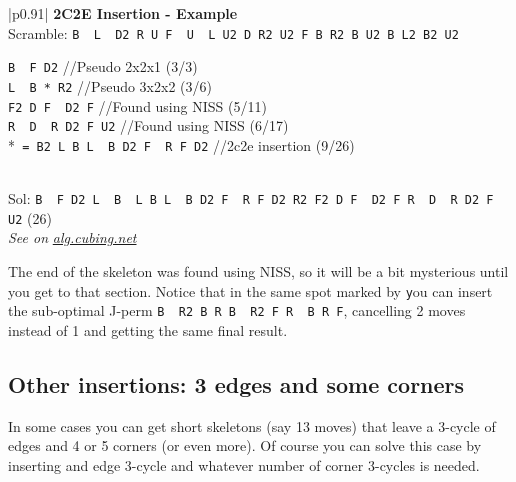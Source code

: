 \documentclass[11pt,a4paper]{book}
\newcommand{\p}{\textquotesingle}
\newcommand{\m}{\texttt}
\newcommand{\ps}{\p\,\,}
\newcommand{\comment}[1]{{\color{gray}\quad//#1}}
\begin{document}
\bigskip
\begin{tabular}{|p{}|}
\hline
\textbf{2C2E Insertion - Example}\\
\hline
Scramble: \m{B\ps L\ps D2 R U F\ps U\ps L U2 D R2 U2 F B R2 B U2 B L2 B2 U2}\\
\hline
\begin{minipage}[l]{0.650\textwidth}
\m{B\ps F D2} \comment{Pseudo 2x2x1 (3/3)}\\
\m{L\ps B * R2} \comment{Pseudo 3x2x2 (3/6)}\\
\m{F2 D F\ps D2 F} \comment{Found using NISS (5/11)}\\
\m{R\ps D\ps R D2 F U2} \comment{Found using NISS (6/17)}\\
*\m{ = B2 L B L\ps B D2 F\ps R F D2} \comment{2c2e insertion (9/26)}
\end{minipage}
\begin{minipage}[c]{0.25\textwidth}

\end{minipage}\\
\hline
Sol: \m{B\ps F D2 L\ps B\ps L B L\ps B D2 F\ps R F D2 R2 F2 D F\ps D2 F R\ps D\ps R D2 F U2} (26)\\
\hline
\emph{See on }\href{https://alg.cubing.net/?setup=B-_L-_D2_R_U_F-_U-_L_U2_D_R2_U2_F_B_R2_B_U2_B_L2_B2_U2&alg=B-_F_D2_\%2F\%2FPseudo_2x2x1_(3\%2F3)\%0AL-_B_(B2_L_B_L-_B_D2_F-_R_F_D2)_R2_\%2F\%2FPseudo_3x2x2_(3\%2F6)\%0AF2_D_F-_D2_F_\%2F\%2FFound_using_NISS_(5\%2F11)\%0AR-_D-_R_D2_F_U2_\%2F\%2FFound_using_NISS_(6\%2F17)}{\emph{alg.cubing.net}}\\
\hline
\end{tabular}
\bigskip

The end of the skeleton was found using NISS, so it will be a bit mysterious until you get to that section. Notice that in the same spot marked by \m * you can insert the sub-optimal J-perm \m{B\ps R2 B R B\ps R2 F R\ps B R F\p}, cancelling 2 moves instead of 1 and getting the same final result.

\subsection{Other insertions: 3 edges and some corners}
\label{3enc}

In some cases you can get short skeletons (say 13 moves) that leave a 3-cycle of edges and 4 or 5 corners (or even more). Of course you can solve this case by inserting and edge 3-cycle and whatever number of corner 3-cycles is needed.
\end{document}
